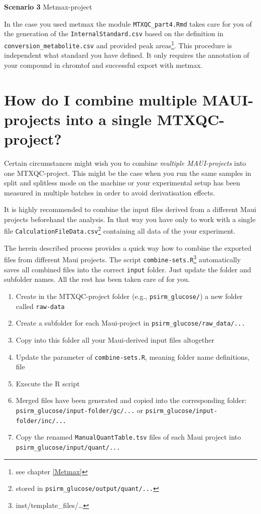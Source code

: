\documentclass[]{book}
\providecommand{\tightlist}{%
  \setlength{\itemsep}{0pt}\setlength{\parskip}{0pt}}
\let\rmarkdownfootnote\footnote%
\def\footnote{\protect\rmarkdownfootnote}
\theoremstyle{definition}
\theoremstyle{definition}
\theoremstyle{definition}
\theoremstyle{remark}
\begin{document}
\textbf{Scenario 3} Metmax-project

In the case you used metmax the module \texttt{MTXQC\_part4.Rmd} takes
care for you of the generation of the \texttt{InternalStandard.csv}
based on the definition in \texttt{conversion\_metabolite.csv} and
provided peak areas\footnote{see chapter \ref{Metmax}}. This procedure
is independent what standard you have defined. It only requires the
annotation of your compound in chromtof and successful export with
metmax.

\section{How do I combine multiple MAUI-projects into a single
MTXQC-project?}\label{multipleproj}

Certain circumstances might wish you to combine \emph{multiple
MAUI-projects} into one MTXQC-project. This might be the case when you
run the same samples in split and splitless mode on the machine or your
experimental setup has been measured in multiple batches in order to
avoid derivatisation effects.

It is highly recommended to combine the input files derived from a
different Maui projects beforehand the analysis. In that way you have
only to work with a single file
\texttt{CalculationFileData.csv}\footnote{stored in
  \texttt{psirm\_glucose/output/quant/...}} containing all data of the
your experiment.

The herein described process provides a quick way how to combine the
exported files from different Maui projects. The script
\texttt{combine-sets.R}\footnote{inst/template\_files/\ldots{}}
automatically saves all combined files into the correct \texttt{input}
folder. Just update the folder and subfolder names. All the rest has
been taken care of for you.

\begin{enumerate}
\def\labelenumi{\arabic{enumi}.}
\tightlist
\item
  Create in the MTXQC-project folder (e.g., \texttt{psirm\_glucose/}) a
  new folder called \texttt{raw-data}
\item
  Create a subfolder for each Maui-project in
  \texttt{psirm\_glucose/raw\_data/...}
\item
  Copy into this folder all your Maui-derived input files altogether
\item
  Update the parameter of \texttt{combine-sets.R}, meaning folder name
  definitions, file
\item
  Execute the R script
\item
  Merged files have been generated and copied into the corresponding
  folder: \texttt{psirm\_glucose/input-folder/gc/...} or
  \texttt{psirm\_glucose/input-folder/inc/...}
\item
  Copy the renamed \texttt{ManualQuantTable.tsv} files of each Maui
  project into \texttt{psirm\_glucose/input/quant/...}
\end{enumerate}
\end{document}
